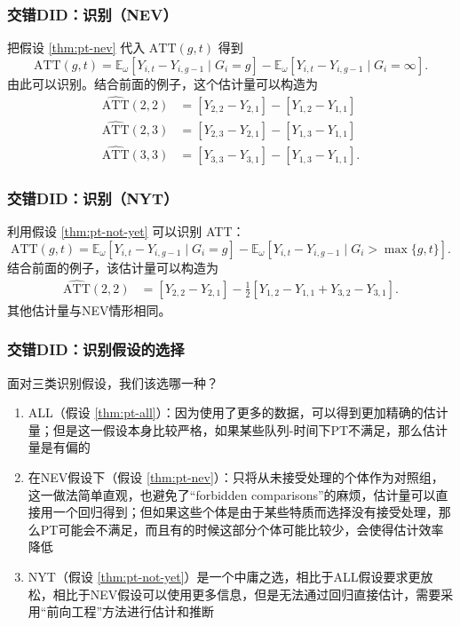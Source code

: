 \documentclass[../didNotes.tex]{subfiles}
\begin{document}
\begin{frame}
  \frametitle{交错DID：识别（NEV）}

  把假设 \ref{thm:pt-nev} 代入 \( \text{ATT}(g,t) \) 得到
  \[
    \text{ATT}(g,t) = \mathbb{E}_{\omega}[Y_{i,t}-Y_{i,g-1} \mid G_i=g] -
    \mathbb{E}_{\omega}[Y_{i,t}-Y_{i,g-1} \mid G_i=\infty]
  .\]
  由此可以识别。结合前面的例子，这个估计量可以构造为
  \begin{align*}
    \widehat{\text{ATT}}(2,2) & =[Y_{2,2}-Y_{2,1}] - [Y_{1,2}-Y_{1,1}] \\
    \widehat{\text{ATT}}(2,3) & =[Y_{2,3}-Y_{2,1}] - [Y_{1,3}-Y_{1,1}] \\
    \widehat{\text{ATT}}(3,3) & =[Y_{3,3}-Y_{3,1}] - [Y_{1,3}-Y_{1,1}]
    .
  \end{align*}
\end{frame}

\begin{frame}
  \frametitle{交错DID：识别（NYT）}

  利用假设 \ref{thm:pt-not-yet} 可以识别 ATT：
  \[
    \text{ATT}(g,t) = \mathbb{E}_{\omega}[Y_{i,t}-Y_{i,g-1} \mid G_i=g] -
    \mathbb{E}_{\omega}[Y_{i,t}-Y_{i,g-1} \mid G_i > \max \{g,t\} ]
  .\]
  结合前面的例子，该估计量可以构造为
  \begin{align*}
    \widehat{\text{ATT}}(2,2) & = [Y_{2,2}-Y_{2,1}] - \frac{1}{2} [Y_{1,2}-Y_{1,1} +
    Y_{3,2}-Y_{3,1}].
  \end{align*}
  其他估计量与NEV情形相同。

\end{frame}

\begin{frame}
  \frametitle{交错DID：识别假设的选择}

  面对三类识别假设，我们该选哪一种？
  \begin{enumerate}
    \item ALL（假设 \ref{thm:pt-all}）：因为使用了更多的数据，可以得到更加精确的估计量；但是这一假设本身比较严格，如果某些队列-时间下PT不满足，那么估计量是有偏的
    \item 在NEV假设下（假设 \ref{thm:pt-nev}）：只将从未接受处理的个体作为对照组，这一做法简单直观，也避免了``forbidden
      comparisons''的麻烦，估计量可以直接用一个回归得到；但如果这些个体是由于某些特质而选择没有接受处理，那么PT可能会不满足，而且有的时候这部分个体可能比较少，会使得估计效率降低
    \item NYT（假设 \ref{thm:pt-not-yet}）是一个中庸之选，相比于ALL假设要求更放松，相比于NEV假设可以使用更多信息，但是无法通过回归直接估计，需要采用``前向工程''方法进行估计和推断
  \end{enumerate}

\end{frame}
\end{document}
